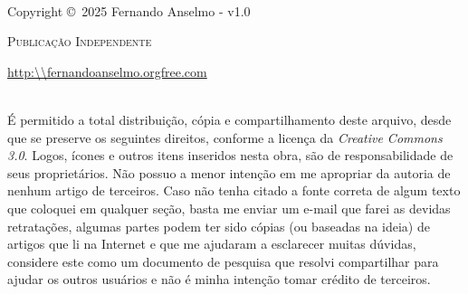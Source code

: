 \documentclass[a4paper,11pt]{book} %
\begin{document}
\begingroup
\thispagestyle{empty}
\vfill
\endgroup

\newpage
~\vfill
\thispagestyle{empty}

\noindent Copyright \copyright\ 2025 Fernando Anselmo - v1.0 %

\noindent \textsc{Publicação Independente} %

\noindent \url{http:\\fernandoanselmo.orgfree.com} %

\noindent \\ É permitido a total distribuição, cópia e compartilhamento deste arquivo, desde que se preserve os seguintes direitos, conforme a licença da \textit{Creative Commons 3.0}. Logos, ícones e outros itens inseridos nesta obra, são de responsabilidade de seus proprietários. Não possuo a menor intenção em me apropriar da autoria de nenhum artigo de terceiros. Caso não tenha citado a fonte correta de algum texto que coloquei em qualquer seção, basta me enviar um e-mail que farei as devidas retratações, algumas partes podem ter sido cópias (ou baseadas na ideia) de artigos que li na Internet e que me ajudaram a esclarecer muitas dúvidas, considere este como um documento de pesquisa que resolvi compartilhar para ajudar os outros usuários e não é minha intenção tomar crédito de terceiros. %


\end{document}
